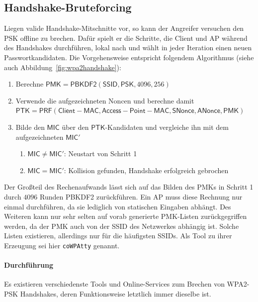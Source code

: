 \subsection{Handshake-Bruteforcing}\label{subs:cracking}
Liegen valide Handshake-Mitschnitte vor, so kann der Angreifer versuchen den PSK offline zu brechen.
Dafür spielt er die Schritte, die Client und AP während des Handshakes durchführen, lokal nach und wählt in jeder Iteration einen neuen Passwortkandidaten.
Die Vorgehensweise entspricht folgendem Algorithmus (siehe auch Abbildung~\ref{fig:wpa2handshake}):
\begin{enumerate}
	\item Berechne $\mathsf{PMK} = \mathsf{PBKDF2}(\mathsf{SSID}, \mathsf{PSK}, 4096, 256)$
	\item Verwende die aufgezeichneten Noncen und berechne damit \\$\mathsf{PTK} = \mathsf{PRF}(\mathsf{Client-MAC},  \mathsf{Access-Point-MAC}, \mathsf{SNonce}, \mathsf{ANonce}, \mathsf{PMK})$
	\item Bilde den $\mathsf{MIC}$ über den $\mathsf{PTK}$-Kandidaten und vergleiche ihn mit dem aufgezeichneten $\mathsf{MIC'}$
	\begin{enumerate}
		\item $\mathsf{MIC} \neq \mathsf{MIC'}$: Neustart von Schritt 1
		\item $\mathsf{MIC} = \mathsf{MIC'}$: Kollision gefunden, Handshake erfolgreich gebrochen
	\end{enumerate}
\end{enumerate}
Der Großteil des Rechenaufwands lässt sich auf das Bilden des PMKs in Schritt 1 durch $4096$ Runden PBKDF2 zurückführen. Ein AP muss diese Rechnung nur einmal durchführen, da sie lediglich von statischen Eingaben abhängt. %
Des Weiteren kann nur sehr selten auf vorab generierte PMK-Listen zurückgegriffen werden, da der PMK auch von der SSID des Netzwerkes abhängig ist. Solche Listen existieren, allerdings nur für die häufigsten SSIDs. Als Tool zu ihrer Erzeugung sei hier \texttt{coWPAtty} genannt.

\paragraph{Durchführung}
Es existieren verschiedenste Tools und Online-Services zum Brechen von WPA2-PSK Handshakes, deren Funktionsweise letztlich immer dieselbe ist.

